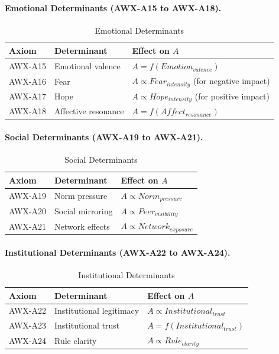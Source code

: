 \paragraph{Emotional Determinants (AWX-A15 to AWX-A18).}

\begin{table}[htbp]
\centering
\caption{Emotional Determinants}
\label{tab:emotional-determinants}
\renewcommand{\arraystretch}{1.3}
\begin{tabular}{@{}lll@{}}
\toprule
\textbf{Axiom} & \textbf{Determinant} & \textbf{Effect on $A$} \\
\midrule
AWX-A15 & Emotional valence & $A = f(Emotion_{valence})$ \\
AWX-A16 & Fear & $A \propto Fear_{intensity}$ (for negative impact) \\
AWX-A17 & Hope & $A \propto Hope_{intensity}$ (for positive impact) \\
AWX-A18 & Affective resonance & $A = f(Affect_{resonance})$ \\
\bottomrule
\end{tabular}
\end{table}

\paragraph{Social Determinants (AWX-A19 to AWX-A21).}

\begin{table}[htbp]
\centering
\caption{Social Determinants}
\label{tab:social-determinants}
\renewcommand{\arraystretch}{1.3}
\begin{tabular}{@{}lll@{}}
\toprule
\textbf{Axiom} & \textbf{Determinant} & \textbf{Effect on $A$} \\
\midrule
AWX-A19 & Norm pressure & $A \propto Norm_{pressure}$ \\
AWX-A20 & Social mirroring & $A \propto Peer_{visibility}$ \\
AWX-A21 & Network effects & $A \propto Network_{exposure}$ \\
\bottomrule
\end{tabular}
\end{table}

\paragraph{Institutional Determinants (AWX-A22 to AWX-A24).}

\begin{table}[htbp]
\centering
\caption{Institutional Determinants}
\label{tab:institutional-determinants}
\renewcommand{\arraystretch}{1.3}
\begin{tabular}{@{}lll@{}}
\toprule
\textbf{Axiom} & \textbf{Determinant} & \textbf{Effect on $A$} \\
\midrule
AWX-A22 & Institutional legitimacy & $A \propto Institutional_{trust}$ \\
AWX-A23 & Institutional trust & $A = f(Institutional_{trust})$ \\
AWX-A24 & Rule clarity & $A \propto Rule_{clarity}$ \\
\bottomrule
\end{tabular}
\end{table}


